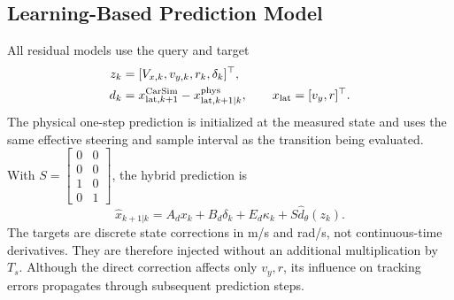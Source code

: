\documentclass[10pt,journal]{IEEEtran}
\begin{document}
\subsection{Learning-Based Prediction Model}
All residual models use the query and target
\begin{align}
 z_k&=[V_{x,k},v_{y,k},r_k,\delta_k]^\top,\\
 d_k&=x_{{\rm lat},k+1}^{\rm CarSim}
       -x_{{\rm lat},k+1|k}^{\rm phys},\qquad
 x_{\rm lat}=[v_y,r]^\top.\label{eq:target}
\end{align}
The physical one-step prediction is initialized at the measured state and uses the same effective steering and sample interval as the transition being evaluated. With
$S=[\begin{smallmatrix}0&0\\0&0\\1&0\\0&1\end{smallmatrix}]$, the hybrid prediction is
\begin{equation}
 \hat x_{k+1|k}=A_dx_k+B_d\delta_k+E_d\kappa_k
                      +S\hat d_\theta(z_k).\label{eq:hybrid}
\end{equation}
The targets are discrete state corrections in m/s and rad/s, not continuous-time derivatives. They are therefore injected without an additional multiplication by $T_s$. Although the direct correction affects only $v_y,r$, its influence on tracking errors propagates through subsequent prediction steps.
\end{document}
